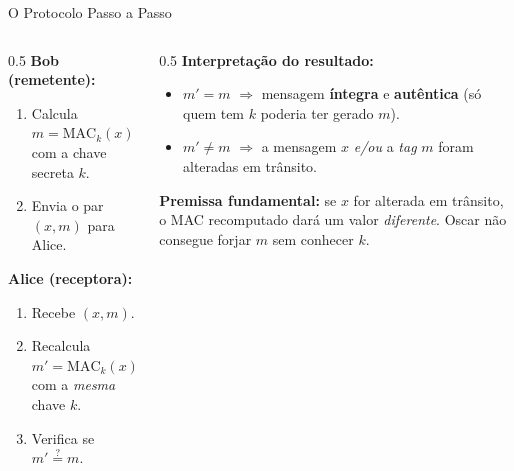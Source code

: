 \documentclass{beamer}
\begin{document}
\begin{frame}{O Protocolo Passo a Passo}
    \begin{columns}[T]
        \begin{column}{0.5\textwidth}
            \textbf{Bob (remetente):}
            \begin{enumerate}
                \footnotesize
                \item Calcula $m = \text{MAC}_k(x)$ com a chave secreta $k$.
                \item Envia o par $(x, m)$ para Alice.
            \end{enumerate}
            \bigskip
            \textbf{Alice (receptora):}
            \begin{enumerate}
                \footnotesize
                \item Recebe $(x, m)$.
                \item Recalcula $m' = \text{MAC}_k(x)$ com a \emph{mesma} chave $k$.
                \item Verifica se $m' \overset{?}{=} m$.
            \end{enumerate}
        \end{column}
        \begin{column}{0.5\textwidth}
            {\small\textbf{Interpretação do resultado:}}
            \begin{itemize}
                \footnotesize
                \item $m' = m$ $\Rightarrow$ mensagem \textbf{íntegra} e \textbf{autêntica} (só quem tem $k$ poderia ter gerado $m$).
                \item $m' \neq m$ $\Rightarrow$ a mensagem $x$ \emph{e/ou} a \textit{tag} $m$ foram \alert{alteradas} em trânsito.
            \end{itemize}
            \medskip
            \begin{tcolorbox}[colback=blue!5,colframe=blue!50!black,boxrule=0.5pt,left=2pt,right=2pt,top=2pt,bottom=2pt]
                \footnotesize
                \textbf{Premissa fundamental:} se $x$ for alterada em trânsito, o MAC recomputado dará um valor \emph{diferente}. Oscar não consegue forjar $m$ sem conhecer $k$.
            \end{tcolorbox}
        \end{column}
    \end{columns}
\end{frame}
\end{document}
